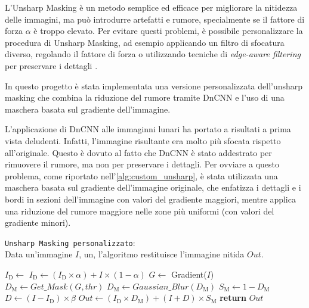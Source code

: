 L'Unsharp Masking è un metodo semplice ed efficace per migliorare la nitidezza delle immagini, ma può introdurre artefatti e rumore, specialmente se il fattore di forza $\alpha$ è troppo elevato. Per evitare questi problemi, è possibile personalizzare la procedura di Unsharp Masking, ad esempio applicando un filtro di sfocatura diverso, regolando il fattore di forza o utilizzando tecniche di \textit{edge-aware filtering} per preservare i dettagli \cite{unsharp_mask}.

In questo progetto è stata implementata una versione personalizzata dell'unsharp masking che combina la riduzione del rumore tramite DnCNN e l'uso di una maschera basata sul gradiente dell'immagine.

L'applicazione di DnCNN alle immaginni lunari ha portato a risultati a prima vista deludenti. Infatti, l'immagine risultante era molto più sfocata rispetto all'originale. Questo è dovuto al fatto che DnCNN è stato addestrato per rimuovere il rumore, ma non per preservare i dettagli. Per ovviare a questo problema, come riportato nell'\cref{alg:custom_unsharp}, è stata utilizzata una maschera basata sul gradiente dell'immagine originale, che enfatizza i dettagli e i bordi in sezioni dell'immagine con valori del gradiente maggiori, mentre applica una riduzione del rumore maggiore nelle zone più uniformi (con valori del gradiente minori).

\begin{algorithm} [H]
    \caption{\texttt{Unsharp Masking personalizzato}:\\ Data un'immagine $I$, un, l'algoritmo restituisce l'immagine nitida $Out$.} \label{alg:custom_unsharp}

    \begin{algorithmic}
            \State $I_{\text{D}} \gets$  
            \State $I_{\text{D}} \gets (I_{\text{D}} \times \alpha) + I \times (1-\alpha)$ 
            \State $G \gets$ Gradient($I$) 
            \State $D_{\text{M}} \gets Get\_Mask(G, thr)$ 
            \State $D_{\text{M}} \gets Gaussian\_Blur(D_{\text{M}})$ 
            \State $S_{\text{M}} \gets 1-D_{\text{M}}$ 
            \State $D \gets (I - I_{\text{D}}) \times \beta$ 
            \State $Out \gets (I_{\text{D}} \times D_{\text{M}}) + (I + D)\times S_{\text{M}}$ 
            \State \textbf{return} $Out$
        \EndFunction
    \end{algorithmic}
\end{algorithm}


